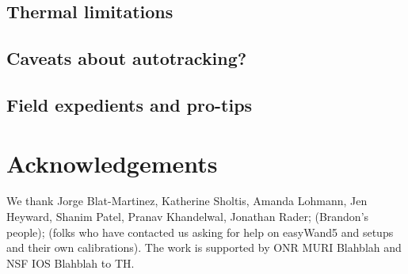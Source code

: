 \documentclass[fleqn,10pt]{wlpeerj}
\begin{document}
\subsection*{Thermal limitations}

\subsection*{Caveats about autotracking?}

\subsection*{Field expedients and pro-tips}

\section*{Acknowledgements}
We thank Jorge Blat-Martinez, Katherine Sholtis, Amanda Lohmann, Jen Heyward, Shanim Patel, Pranav Khandelwal, Jonathan Rader; (Brandon's people); (folks who have contacted us asking for help on easyWand5 and setups and their own calibrations). The work is supported by ONR MURI Blahblah and NSF IOS Blahblah to TH. 


\end{document}
